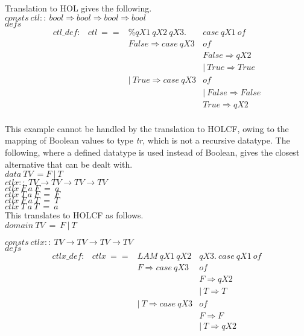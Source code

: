 \documentclass{llncs}
\begin{document}
\noindent Translation to HOL gives the following.\\

\noindent $consts \ ctl :: \ bool \Rightarrow bool \Rightarrow bool \Rightarrow bool$\\

\noindent $defs$
$$\begin{array}{llll}
  ctl\_def : & ctl \ == & \% qX1 \ qX2 \ qX3. & case \ qX1 \ of \\
  & &  False \Rightarrow case \ qX3 & of \\
  & & &  False \Rightarrow qX2  \\
  & & & | \ True \Rightarrow True  \\
  & & | \ True \Rightarrow case \ qX3 & of \\
  & & & | \ False \Rightarrow False  \\
  & & & True \Rightarrow qX2 \\
\end{array}$$

\noindent This example cannot be handled by the translation to
HOLCF, owing to the mapping of Boolean values to type \emph{tr}, which is not
a recursive datatype. The following, where a defined datatype is used instead
of Boolean, gives the closest alternative that can be dealt with.\\

\noindent $data \ TV \ =  F \ | \ T $\\
\noindent $ctlx ::  \ TV \to TV \to TV \to TV $ \\
$ctlx \ F \ a \ F \ = \ a $ \\
$ctlx \ T \ a \ F \ = \ F $ \\
$ctlx \ F \ a \ T \ = \ T $ \\
$ctlx \ T \ a \ T \ = \ a $\\

\noindent This translates to HOLCF as follows.\\

\noindent $domain \ TV \ = \ F \ | \ T $

\noindent $consts \ ctlx :: \ TV \to TV \to TV \to TV $\\

\noindent $defs$
$$\begin{array}{llll}
  ctlx\_def : & ctlx \ == & LAM \ qX1 \ qX2 & qX3. \ case \ qX1 \ of \\
  & & F \Rightarrow case \ qX3 & of  \\
  & & & F \Rightarrow qX2  \\
  & & & | \ T \Rightarrow T  \\
  & & | \ T \Rightarrow case \ qX3 & of  \\
  & & & F \Rightarrow F  \\
  & & & | \ T \Rightarrow qX2 \\
\end{array}$$
\end{document}
